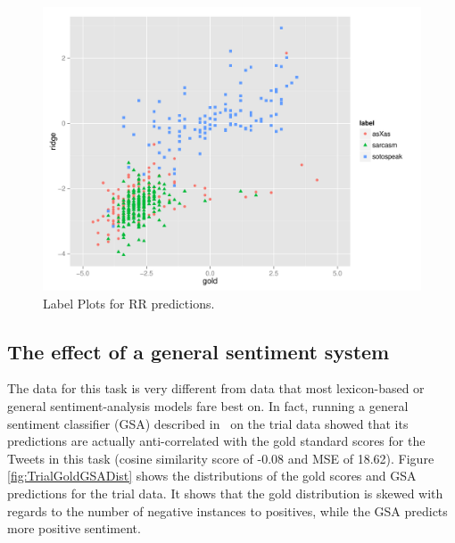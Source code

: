 \documentclass[11pt,letterpaper]{article}
\begin{document}
\begin{figure}[ht!]
    \centering
    \includegraphics[width=1.05\columnwidth]{trialplotv2.pdf}
    \caption{Label Plots for {\sc RR} predictions.}
    \label{fig:LabelPlot.Sarc.soto.asX}
\end{figure}


\subsection*{The effect of a general sentiment system}
The data for this task is very different from data that most lexicon-based or general sentiment-analysis models fare best on. In fact, running a general sentiment classifier (GSA) described in~ on the trial data showed that its predictions are actually anti-correlated with the gold standard scores for the Tweets in this task (cosine similarity score of -0.08 and MSE of
18.62). Figure \ref{fig:TrialGoldGSADist} shows the distributions of the gold scores and GSA predictions for the trial data. It shows that the gold distribution is skewed with regards to the number of negative instances to positives, while the GSA predicts more positive sentiment.
\end{document}
